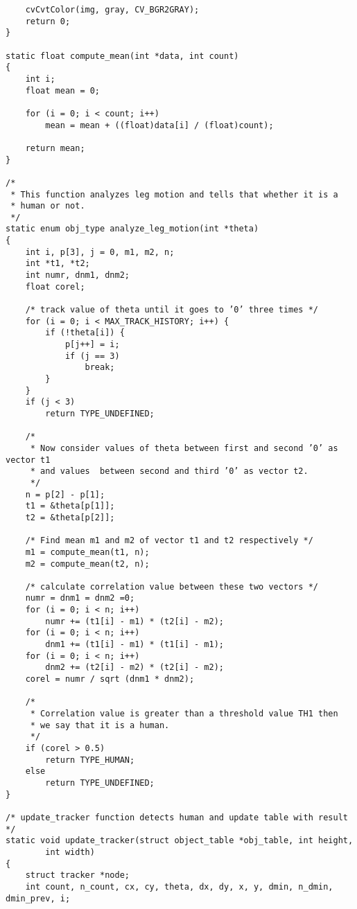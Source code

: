 \begin{lstlisting}
	cvCvtColor(img, gray, CV_BGR2GRAY);
	return 0;
}

static float compute_mean(int *data, int count)
{
	int i;
	float mean = 0;

	for (i = 0; i < count; i++)
		mean = mean + ((float)data[i] / (float)count);

	return mean;
}

/*
 * This function analyzes leg motion and tells that whether it is a
 * human or not.
 */
static enum obj_type analyze_leg_motion(int *theta)
{
	int i, p[3], j = 0, m1, m2, n;
	int *t1, *t2;
	int numr, dnm1, dnm2;
	float corel;

	/* track value of theta until it goes to ’0’ three times */
	for (i = 0; i < MAX_TRACK_HISTORY; i++) {
		if (!theta[i]) {
			p[j++] = i;
			if (j == 3)
				break;
		}
	}
	if (j < 3)
		return TYPE_UNDEFINED;

	/*
	 * Now consider values of theta between first and second ’0’ as vector t1
	 * and values  between second and third ’0’ as vector t2.
	 */
	n = p[2] - p[1];
	t1 = &theta[p[1]];
	t2 = &theta[p[2]];

	/* Find mean m1 and m2 of vector t1 and t2 respectively */
	m1 = compute_mean(t1, n);
	m2 = compute_mean(t2, n);

	/* calculate correlation value between these two vectors */
	numr = dnm1 = dnm2 =0;
	for (i = 0; i < n; i++)
		numr += (t1[i] - m1) * (t2[i] - m2);
	for (i = 0; i < n; i++)
		dnm1 += (t1[i] - m1) * (t1[i] - m1);
	for (i = 0; i < n; i++)
		dnm2 += (t2[i] - m2) * (t2[i] - m2);
	corel = numr / sqrt (dnm1 * dnm2);

	/*
	 * Correlation value is greater than a threshold value TH1 then
	 * we say that it is a human.
	 */
	if (corel > 0.5)
		return TYPE_HUMAN;
	else
		return TYPE_UNDEFINED;
}

/* update_tracker function detects human and update table with result */
static void update_tracker(struct object_table *obj_table, int height,
		int width)
{
	struct tracker *node;
	int count, n_count, cx, cy, theta, dx, dy, x, y, dmin, n_dmin, dmin_prev, i;


\end{lstlisting}
